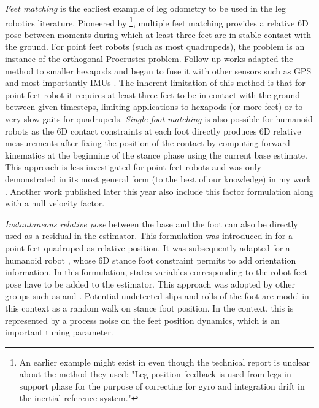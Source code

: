 \textit{Feet matching} is the earliest example of leg odometry to be used in the leg robotics literature. Pioneered by \cite{roston1991dead} 
\footnote{An earlier example might exist in \cite{waldron1986adaptive} even though the technical report is unclear about the method they used: 
"Leg-position feedback is used from legs in support phase for the purpose of correcting for gyro and integration drift in the inertial reference system."},
multiple feet matching provides a relative 6D pose between moments during which at least three feet are in stable contact with the ground.
For point feet robots (such as most quadrupeds), the problem %
is an instance of the orthogonal Procrustes problem.
Follow up works adapted the method to smaller hexapods \cite{lin2005leg} and began to fuse it with other sensors such as GPS \cite{gassmann2005localization, cobano2008location} 
and most importantly IMUs \cite{lin2006sensor, reinstein2011dead}.
The inherent limitation of this method is that for point feet robot it requires at least three feet to be in contact with the ground between given timesteps, limiting
applications to hexapods (or more feet) or to very slow gaits for quadrupeds.
\textit{Single foot matching} is also possible for humanoid robots as the 6D contact constraints at each foot directly produces 6D 
relative measurements \cite{flayols2017experimental,xinjilefu2014decoupled,johnson2015team} after fixing the position of the contact by computing forward kinematics 
at the beginning of the stance phase using the current base estimate. This approach is less investigated for point feet robots and was only 
demonstrated in its most general form (to the best of our knowledge) in my work \cite{fourmy2021contact}. Another work published later this year \cite{kim2021legged} also include this factor formulation along with a null velocity factor. 

\textit{Instantaneous relative pose} between the base and the foot can also be directly used as a residual in the estimator. This formulation
was introduced in \cite{bloesch2013state, bloesch2013stateSlippery} for a point feet quadruped as relative position. It was subsequently adapted for a humanoid robot \cite{rotella2014state}, 
whose 6D stance foot constraint permits to add orientation information. In this formulation, states variables corresponding to the robot feet pose have to 
be added to the estimator. This approach was adopted by other groups such as \cite{hartley2018legged, hartley2018hybrid, hartley2020contact} and \cite{bledt2018cheetah}.
Potential undetected slips and rolls of the foot are model in this context as a random walk on stance foot position. In the \KalmanF context, this is represented
by a process noise on the feet position dynamics, which is an important tuning parameter.

